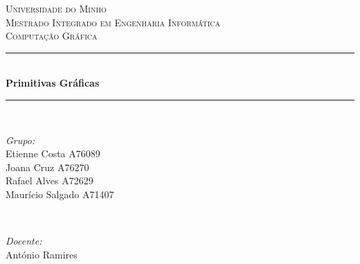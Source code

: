 \documentclass[12pt]{article}
\begin{document}
\begin{titlepage}

\newcommand{\HRule}{\rule{\linewidth}{0.5mm}} %

\center %
    

\textsc{\LARGE Universidade do Minho}\\[1.5cm] 
\textsc{\Large Mestrado Integrado em Engenharia Informática}\\[0.5cm] 
\textsc{\large Computação Gráfica}\\[0.5cm]


\HRule \\[0.4cm]
{ \huge \bfseries Primitivas Gráficas}\\[0.4cm] 
\HRule \\[1.5cm]
    

\begin{minipage}{0.4\textwidth}
\begin{flushleft} \large
\emph{Grupo:}\\
Etienne Costa A76089 \\
Joana Cruz A76270 \\
Rafael Alves A72629 \\
Maurício Salgado A71407 \\
\end{flushleft}
\end{minipage}
~
\begin{minipage}{0.4\textwidth}
\begin{flushright} \large
\emph{Docente:} \\
António Ramires\\
\end{flushright}
\end{minipage}\\[2cm]


\end{titlepage}
\end{document}
